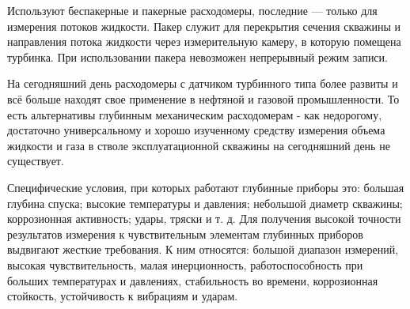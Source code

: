 
Используют беспакерные и пакерные расходомеры, последние --- только для измерения потоков жидкости. Пакер служит для перекрытия сечения скважины и направления потока жидкости через измерительную камеру, в которую помещена турбинка. При использовании пакера невозможен непрерывный режим записи.

На сегодняшний день расходомеры с датчиком турбинного типа более развиты и всё больше находят свое применение в нефтяной и газовой промышленности. То есть альтернативы глубинным механическим расходомерам - как недорогому, достаточно универсальному и хорошо изученному средству измерения объема жидкости и газа в стволе 
эксплуатационной скважины на сегодняшний день не существует.

Специфические условия, при которых работают глубинные приборы это: большая глубина спуска; высокие температуры и давления; небольшой диаметр скважины; коррозионная активность; удары, тряски и т. д. Для получения высокой точности результатов измерения к чувствительным элементам глубинных приборов выдвигают жесткие требования. К ним относятся: большой диапазон измерений, высокая чувствительность, малая инерционность, работоспособность при больших температурах и давлениях, стабильность во времени, коррозионная стойкость, устойчивость к вибрациям и ударам. 

\clearpage
